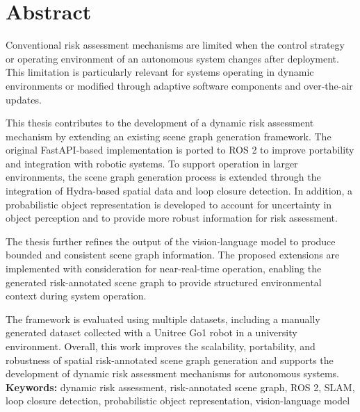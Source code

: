 \chapter*{Abstract}

Conventional risk assessment mechanisms are limited when the control strategy or operating environment of an autonomous system changes after deployment. This limitation is particularly relevant for systems operating in dynamic environments or modified through adaptive software components and over-the-air updates.

This thesis contributes to the development of a dynamic risk assessment mechanism by extending an existing scene graph generation framework. The original FastAPI-based implementation is ported to ROS 2 to improve portability and integration with robotic systems. To support operation in larger environments, the scene graph generation process is extended through the integration of Hydra-based spatial data and loop closure detection. In addition, a probabilistic object representation is developed to account for uncertainty in object perception and to provide more robust information for risk assessment.

The thesis further refines the output of the vision-language model to produce bounded and consistent scene graph information. The proposed extensions are implemented with consideration for near-real-time operation, enabling the generated risk-annotated scene graph to provide structured environmental context during system operation.

The framework is evaluated using multiple datasets, including a manually generated dataset collected with a Unitree Go1 robot in a university environment. Overall, this work improves the scalability, portability, and robustness of spatial risk-annotated scene graph generation and supports the development of dynamic risk assessment mechanisms for autonomous systems.
\vfill
\noindent\textbf{Keywords:} dynamic risk assessment, risk-annotated scene graph, ROS 2, SLAM, loop closure detection, probabilistic object representation, vision-language model
\vfill
